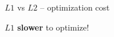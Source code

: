 \documentclass[11pt,compress,t,notes=noshow, xcolor=table]{beamer}
\begin{document}
\begin{vbframe}{$L1$ vs $L2$ -- optimization cost}
\begin{minipage}[c]{0.45\textwidth}
    \vspace{0.7cm}
    \normalsize
    $L1$ \textbf{slower} to optimize!
\end{minipage}

\end{vbframe}

\endlecture
\end{document}

